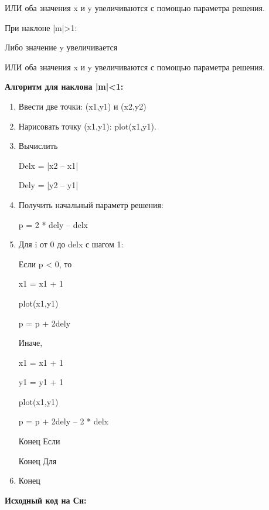 ИЛИ оба значения x и y увеличиваются с помощью параметра решения.

При наклоне |m|>1:

Либо значение y увеличивается

ИЛИ оба значения x и y увеличиваются с помощью параметра решения.

\textbf{Алгоритм для наклона |m|<1:}
\begin{enumerate}
\item Ввести две точки: (x1,y1) и (x2,y2)
\item Нарисовать точку (x1,y1): plot(x1,y1).
\item {\setlength{\parskip}{0cm}Вычислить

Delx = |x2 – x1|

Dely = |y2 – y1|}
\item {\setlength{\parskip}{0cm}Получить начальный параметр решения:

p = 2 * dely – delx}
\item {\setlength{\parskip}{0cm}Для i от 0 до delx с шагом 1:

Если p < 0, то

x1 = x1 + 1

plot(x1,y1)

p = p + 2dely

Иначе,

x1 = x1 + 1

y1 = y1 + 1

plot(x1,y1)

p = p + 2dely – 2 * delx

Конец Если

Конец Для}

\item Конец
\end{enumerate}
\newpage
\textbf{Исходный код на Си:}

